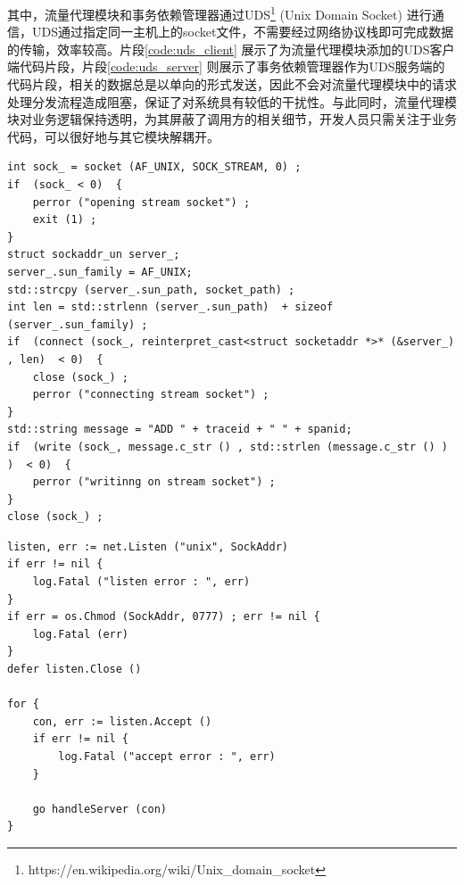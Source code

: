 \documentclass[macfonts,master]{njuthesis}
\begin{document}
其中，流量代理模块和事务依赖管理器通过UDS\footnote{https://en.wikipedia.org/wiki/Unix\_domain\_socket} (Unix Domain Socket) 进行通信，UDS通过指定同一主机上的socket文件，不需要经过网络协议栈即可完成数据的传输，效率较高。片段\ref{code:uds_client} 展示了为流量代理模块添加的UDS客户端代码片段，片段\ref{code:uds_server} 则展示了事务依赖管理器作为UDS服务端的代码片段，相关的数据总是以单向的形式发送，因此不会对流量代理模块中的请求处理分发流程造成阻塞，保证了对系统具有较低的干扰性。与此同时，流量代理模块对业务逻辑保持透明，为其屏蔽了调用方的相关细节，开发人员只需关注于业务代码，可以很好地与其它模块解耦开。

\begin{lstlisting}[caption={UDS客户端}, label={code:uds_client}, style=cppStyle]
int sock_ = socket (AF_UNIX, SOCK_STREAM, 0) ;
if  (sock_ < 0)  {
	perror ("opening stream socket") ;
	exit (1) ;
}
struct sockaddr_un server_;
server_.sun_family = AF_UNIX;
std::strcpy (server_.sun_path, socket_path) ;
int len = std::strlenn (server_.sun_path)  + sizeof (server_.sun_family) ;
if  (connect (sock_, reinterpret_cast<struct socketaddr *>* (&server_) , len)  < 0)  {
	close (sock_) ;
	perror ("connecting stream socket") ;
}
std::string message = "ADD " + traceid + " " + spanid;
if  (write (sock_, message.c_str () , std::strlen (message.c_str () ) )  < 0)  {
	perror ("writinng on stream socket") ;
} 
close (sock_) ;
\end{lstlisting}

\begin{lstlisting}[caption={UDS服务端}, label={code:uds_server}, style=golangStyle]
listen, err := net.Listen ("unix", SockAddr) 
if err != nil {
	log.Fatal ("listen error : ", err) 
}
if err = os.Chmod (SockAddr, 0777) ; err != nil {
	log.Fatal (err) 
}
defer listen.Close () 

for {
	con, err := listen.Accept () 
	if err != nil {
		log.Fatal ("accept error : ", err) 
	}

	go handleServer (con) 
}
\end{lstlisting}

\end{document}
